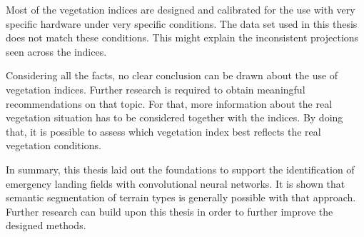 Most of the vegetation indices are designed and calibrated for the use with very specific hardware under very specific conditions. The data set used in this thesis does not match these conditions.
This might explain the inconsistent projections seen across the indices.

Considering all the facts, no clear conclusion can be drawn about the use of vegetation indices. Further research is required to obtain meaningful recommendations on that topic. For that, more information about the real vegetation situation has to be considered together with the indices. By doing that, it is possible to assess which vegetation index best reflects the real vegetation conditions.

In summary, this thesis laid out the foundations to support the identification of emergency landing fields with convolutional neural networks. It is shown that semantic segmentation of terrain types is generally possible with that approach. Further research can build upon this thesis in order to further improve the designed methods.

\newpage